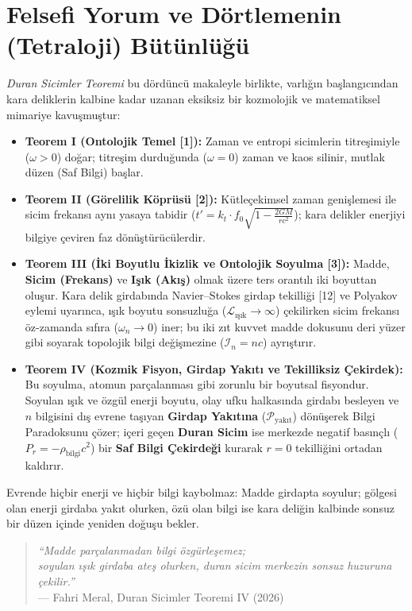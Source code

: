 \documentclass[12pt,a4paper]{article}
\begin{document}
\section{Felsefi Yorum ve Dörtlemenin (Tetraloji) Bütünlüğü}

\textit{Duran Sicimler Teoremi} bu dördüncü makaleyle birlikte, varlığın başlangıcından kara deliklerin kalbine kadar uzanan eksiksiz bir kozmolojik ve matematiksel mimariye kavuşmuştur:

\begin{itemize}
    \item \textbf{Teorem I (Ontolojik Temel [1]):} Zaman ve entropi sicimlerin titreşimiyle ($\omega > 0$) doğar; titreşim durduğunda ($\omega = 0$) zaman ve kaos silinir, mutlak düzen (Saf Bilgi) başlar.
    \item \textbf{Teorem II (Görelilik Köprüsü [2]):} Kütleçekimsel zaman genişlemesi ile sicim frekansı aynı yasaya tabidir ($t' = k_t \cdot f_0 \sqrt{1 - \frac{2GM}{rc^2}}$); kara delikler enerjiyi bilgiye çeviren faz dönüştürücülerdir.
    \item \textbf{Teorem III (İki Boyutlu İkizlik ve Ontolojik Soyulma [3]):} Madde, \textbf{Sicim (Frekans)} ve \textbf{Işık (Akış)} olmak üzere ters orantılı iki boyuttan oluşur. Kara delik girdabında Navier--Stokes girdap tekilliği [12] ve Polyakov eylemi uyarınca, ışık boyutu sonsuzluğa ($\mathcal{L}_{\text{ışık}} \to \infty$) çekilirken sicim frekansı öz-zamanda sıfıra ($\omega_n \to 0$) iner; bu iki zıt kuvvet madde dokusunu deri yüzer gibi soyarak topolojik bilgi değişmezine ($\mathcal{I}_n = n c$) ayrıştırır.
    \item \textbf{Teorem IV (Kozmik Fisyon, Girdap Yakıtı ve Tekilliksiz Çekirdek):} Bu soyulma, atomun parçalanması gibi zorunlu bir boyutsal fisyondur. Soyulan ışık ve özgül enerji boyutu, olay ufku halkasında girdabı besleyen ve $n$ bilgisini dış evrene taşıyan \textbf{Girdap Yakıtına} ($\mathcal{P}_{\text{yakıt}}$) dönüşerek Bilgi Paradoksunu çözer; içeri geçen \textbf{Duran Sicim} ise merkezde negatif basınçlı ($P_r = -\rho_{\text{bilgi}}c^2$) bir \textbf{Saf Bilgi Çekirdeği} kurarak $r=0$ tekilliğini ortadan kaldırır.
\end{itemize}

Evrende hiçbir enerji ve hiçbir bilgi kaybolmaz: Madde girdapta soyulur; gölgesi olan enerji girdaba yakıt olurken, özü olan bilgi ise kara deliğin kalbinde sonsuz bir düzen içinde yeniden doğuşu bekler.

\begin{quote}
\textit{``Madde parçalanmadan bilgi özgürleşemez;\\
soyulan ışık girdaba ateş olurken, duran sicim merkezin sonsuz huzuruna çekilir.''}\\
— Fahri Meral, Duran Sicimler Teoremi IV (2026)
\end{quote}
\end{document}
